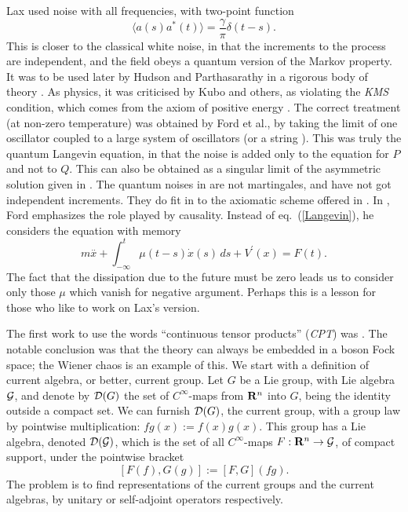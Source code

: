 Lax \cite{Lax} used noise with all frequencies, with two-point function
\[ \langle a(s)a^*(t)\rangle=\frac{\gamma}{\pi}\delta(t-s).\]
This is closer to the classical white noise, in that the increments to
the process are independent, and the field obeys a quantum version of
the Markov property. It was to be used
later by Hudson and Parthasarathy in a rigorous body of theory
\cite{Hudson3,Partha2}.
As physics, it was criticised by Kubo and others, as violating the
{\em KMS} condition, which comes from the
axiom of positive energy \cite{Haag}. The correct treatment (at
non-zero temperature) was obtained by Ford et al., \cite{Ford} by taking
the limit of one oscillator
coupled to a large system of oscillators (or a string \cite{Lewishb}).
This was truly the quantum Langevin equation, in that the noise is added
only to the equation for $P$ and not to $Q$. This can also be obtained
\cite{HLK} as a singular limit of the asymmetric solution given in
\cite{RFS5}. The quantum noises in \cite{Ford,RFS5} are not martingales,
and have not got independent increments. They do fit in to the axiomatic
scheme offered in \cite{Accardi}. In \cite{Ford2},
Ford emphasizes the role played by causality. Instead of eq.~(\ref{Langevin}),
he considers the equation with memory
\begin{equation}
m\stackrel{..}{x}+\int_{-\infty}^t \mu(t-s)\dot{x}(s)\,ds+V^\prime(x)=F(t).
\end{equation}
The fact that the dissipation due to the future must be zero leads us
to consider only those $\mu$ which vanish for negative argument.
Perhaps this is a lesson for
those \cite{ArakiW,Streater2,RFS3,HIK,Hudson3,Partha2} who like to work
on Lax's version. 

The first work to use the words ``continuous
tensor products'' ({\em CPT}) was \cite{ArakiW}. The notable conclusion was that the
theory can always be embedded in a boson Fock space; the Wiener chaos is an
example of this. We start with a definition of current algebra, or
better, current group. Let $G$ be a Lie group, with Lie algebra ${\cal G}$,
and denote by ${\cal D}(G)$ the set
of $C^\infty$-maps from ${\bf R}^n$ into $G$, being the identity outside
a compact set. We can furnish ${\cal D}(G)$, the current group,
with a group law by pointwise
multiplication: $fg(x):=f(x)g(x)$. This group has a Lie algebra, denoted
${\cal D}({\cal G})$, which is the set of
all $C^\infty$-maps $F:{\bf R}^n\rightarrow {\cal G}$, of compact support,
under the pointwise bracket
\cite{RFS3}
\[ [F(f),G(g)]:=[F,G](fg).\]
The problem is to find representations of the current groups and
the current algebras, by unitary or self-adjoint operators respectively.

